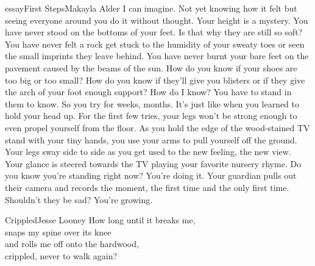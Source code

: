 
\begin{prose}{essay}{First Steps}{Makayla Alder}
I can imagine. Not yet knowing how it felt but seeing everyone around you do it without thought. Your height is a mystery. You have never stood on the bottoms of your feet. Is that why they are still so soft? You have never felt a rock get stuck to the humidity of your sweaty toes or seen the small imprints they leave behind. You have never burnt your bare feet on the pavement caused by the beams of the sun. How do you know if your shoes are too big or too small? How do you know if they'll give you blisters or if they give the arch of your foot enough support? How do I know? You have to stand in them to know. So you try for weeks, months. It's just like when you learned to hold your head up. For the first few tries, your legs won't be strong enough to even propel yourself from the floor. As you hold the edge of the wood-stained TV stand with your tiny hands, you use your arms to pull yourself off the ground. Your legs sway side to side as you get used to the new feeling, the new view. Your glance is steered towards the TV playing your favorite nursery rhyme. Do you know you're standing right now? You're doing it. Your guardian pulls out their camera and records the moment, the first time and the only first time. Shouldn't they be sad? You're growing.
\end{prose}

\begin{poetry}{Crippled}{Jesse Looney}
How long until it breaks me,\\
snaps my spine over its knee\\
and rolls me off onto the hardwood,\\
crippled, never to walk again?
\end{poetry}

